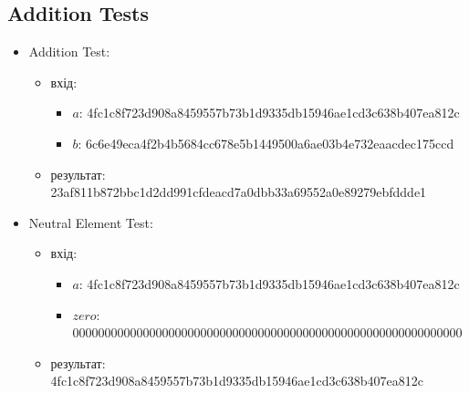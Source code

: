 \documentclass{article}
\begin{document}
\subsection{Addition Tests}
\begin{itemize}
    \item Addition Test:
        \begin{itemize}
            \item вхід: 
                \begin{itemize}
                    \item $a$: 4fc1c8f723d908a8459557b73b1d9335db15946ae1cd3c638b407ea812c
                    \item $b$: 6c6e49eca4f2b4b5684cc678e5b1449500a6ae03b4e732eaacdec175ccd
                \end{itemize}
            \item  результат: 23af811b872bbc1d2dd991cfdeacd7a0dbb33a69552a0e89279ebfddde1
        \end{itemize}
    \item Neutral Element Test:
        \begin{itemize}
            \item вхід: 
                \begin{itemize}
                    \item $a$: 4fc1c8f723d908a8459557b73b1d9335db15946ae1cd3c638b407ea812c
                    \item $zero$: 0000000000000000000000000000000000000000000000000000000000000
                \end{itemize}
            \item  результат: 4fc1c8f723d908a8459557b73b1d9335db15946ae1cd3c638b407ea812c
        \end{itemize}
\end{itemize}
\end{document}
